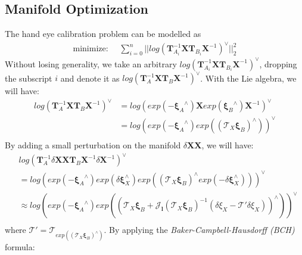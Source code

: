 \documentclass[a4paper]{report}
\begin{document}
\subsection{Manifold Optimization}
The hand eye calibration problem can be modelled as
\begin{align}
\text{minimize: }& \ \sum_{i=0}^{n} ||log\left( \mathbf{T}_{A_i}^{-1}\mathbf{X}\mathbf{T}_{B_i}\mathbf{X}^{-1} \right)^{\vee}||_2^2 
\end{align}
Without losing generality, we take an arbitrary $log\left( \mathbf{T}_{A_i}^{-1}\mathbf{X}\mathbf{T}_{B_i}\mathbf{X}^{-1} \right)^{\vee}$, dropping the subscript $i$ and denote it as $log\left( \mathbf{T}_{A}^{-1}\mathbf{X}\mathbf{T}_{B}\mathbf{X}^{-1} \right)^{\vee}$. With the Lie algebra, we will have:
\begin{align}
log\left( \mathbf{T}_{A}^{-1}\mathbf{X}\mathbf{T}_{B}\mathbf{X}^{-1} \right)^{\vee}&=
log\left( exp(-{\mathbf{\xi}_A}^{\wedge})\mathbf{X}exp({\mathbf{\xi}_B}^{\wedge})\mathbf{X}^{-1} \right)^{\vee} \\
&= log\left( exp\left(-{\mathbf{\xi}_A}^{\wedge}\right) exp\left(\left(\mathbf{\mathcal{T}}_X{\mathbf{\xi}_B}\right)^{\wedge}\right) \right)^{\vee} \\
\end{align}
By adding a small perturbation on the manifold $\delta \mathbf{X}\mathbf{X}$, we will have:
\begin{align}
&log \left( \mathbf{T}_{A}^{-1}{\delta\mathbf{X}}\mathbf{X}\mathbf{T}_{B}\mathbf{X}^{-1}{\delta\mathbf{X}^{-1}} \right)^{\vee} \\
&= log\left( exp\left(-{\mathbf{\xi}_A}^{\wedge}\right) {exp(\delta \mathbf{\xi}_{X}^{\wedge})} exp\left(\left(\mathcal{T}_X{\mathbf{\xi}_B}\right)^{\wedge} {exp(-\delta \mathbf{\xi}_{X}^{\wedge})}\right) \right)^{\vee}\\
&\approx log\left( exp\left(-{\mathbf{\xi}_A}^{\wedge}\right) exp
\left(
\left( 
\mathcal{T}_X{\mathbf{\xi}_B} + \mathbf{\mathcal{J}_{l}}
\left(
\mathcal{T}_X{\mathbf{\xi}_B}
\right) ^{-1} 
\left( 
\delta \xi_{X} - \mathbf{\mathcal{T}}' \delta \xi_{X}
\right)
\right)^{\wedge}
\right)
\right)^{\vee} \\
\end{align}
where $\mathbf{\mathcal{T}}' = \mathbf{\mathcal{T}}_{exp\left(\left(\mathcal{T}_X{\mathbf{\xi}_B}\right)^{\wedge}\right)}$. By applying the \textit{Baker-Campbell-Hausdorff (BCH)} formula:
\end{document}
